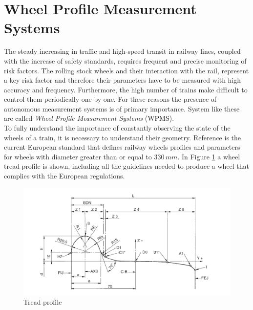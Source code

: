 \section{Wheel Profile Measurement Systems}
\label{sec:sc-wpms}
The steady increasing in traffic and high-speed transit in railway lines, coupled with the increase of safety standards, requires frequent and precise monitoring of risk factors. The rolling stock wheels and their interaction with the rail, represent a key risk factor and therefore their parameters have to be measured with high accuracy and frequency. Furthermore, the high number of trains make difficult to control them periodically one by one. For these reasons the presence of autonomous measurement systems is of primary importance. System like these are called \textit{Wheel Profile Measurement Systems} (\acs{WPMS}). \\

To fully understand the importance of constantly observing the state of the wheels of a train, it is necessary to understand their geometry. Reference \cite{european-norm} is the current European standard that defines railway wheels profiles and parameters for wheels with diameter greater than or equal to $330 \, mm$. In Figure \ref{fig:uni-profile} a wheel tread profile is shown, including all the guidelines needed to produce a wheel that complies with the European regulations.
  \begin{figure}[t!]
    \centering
      \centering
      \includegraphics[width=\textwidth]{./images/wpms/uni_profile.png}
    \caption{Tread profile}
    \label{fig:uni-profile}
  \end{figure}

